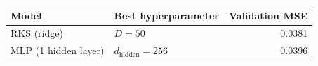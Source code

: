 \begin{tabular}{llr}
\toprule
Model & Best hyperparameter & Validation MSE \\
\midrule
RKS (ridge) & $D = 50$ & 0.0381 \\
MLP (1 hidden layer) & $d_{\mathrm{hidden}} = 256$ & 0.0396 \\
\bottomrule
\end{tabular}
